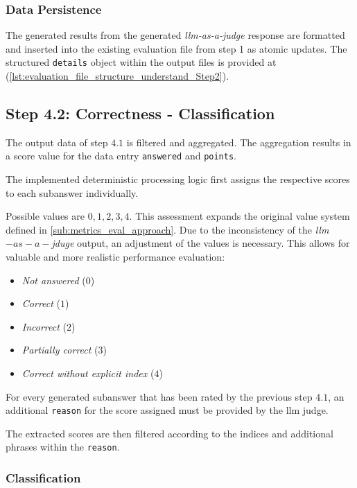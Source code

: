 \subsubsection{Data Persistence}

The generated results from the generated \textit{llm-as-a-judge} response are formatted and inserted into the existing evaluation file from step 1 as atomic updates.
The structured \texttt{details} object within the output files is provided at (\cref{lst:evaluation_file_structure_understand_Step2}).
%
\subsection[Step 4.2: Correctness]{Step 4.2: Correctness - Classification}\label{sub:Step4_2_correct}

The output data of step $4.1$ is filtered and aggregated.
The aggregation results in a score value for the data entry \texttt{answered} and \texttt{points}.
%

The implemented deterministic processing logic first assigns the respective scores to each subanswer individually.

Possible values are $0,1,2,3,4$.
This assessment expands the original value system defined in \cref{sub:metrics_eval_approach}.
Due to the inconsistency of the \textit{llm$-as-a-$jduge} output, an adjustment of the values is necessary.
This allows for valuable and more realistic performance evaluation:

\begin{itemize}
    \item \textit{Not answered} ($0$)
    \item \textit{Correct} ($1$)
    \item \textit{Incorrect} ($2$)
    \item \textit{Partially correct} ($3$)
    \item \textit{Correct without explicit index} ($4$)
\end{itemize}
%
For every generated subanswer that has been rated by the previous step $4.1$, an additional \texttt{reason} for the score assigned must be provided by the \ac{llm} judge.

The extracted scores are then filtered according to the indices and additional phrases within the \texttt{reason}.
%
\subsubsection{Classification}

